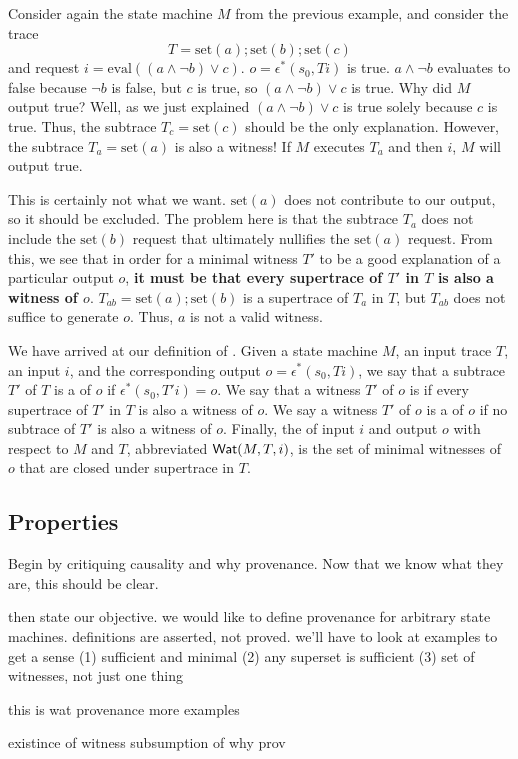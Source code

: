 \begin{example}
  \newcommand{\Mset}{\text{set}}
  \newcommand{\Meval}{\text{eval}}
  Consider again the state machine $M$ from the previous example, and consider
  the trace
  \[
    T = \Mset(a); \Mset(b); \Mset(c)
  \]
  and request $i = \Meval((a \land \lnot b) \lor c)$. $o = \epsilon^*(s_0, Ti)$
  is true. $a \land \lnot b$ evaluates to false because $\lnot b$ is false, but
  $c$ is true, so $(a \land \lnot b) \lor c$ is true.
  Why did $M$ output true? Well, as we just explained $(a \land \lnot b) \lor
  c$ is true solely because $c$ is true. Thus, the subtrace $T_c = \Mset(c)$
  should be the only explanation. However, the subtrace $T_a = \Mset(a)$ is
  also a witness! If $M$ executes $T_a$ and then $i$, $M$ will output true.

  This is certainly not what we want. $\Mset(a)$ does not contribute to our
  output, so it should be excluded. The problem here is that the subtrace $T_a$
  does not include the $\Mset(b)$ request that ultimately nullifies the
  $\Mset(a)$ request. From this, we see that in order for a minimal witness
  $T'$ to be a good explanation of a particular output $o$, \textbf{it must be
  that every supertrace of $T'$ in $T$ is also a witness of $o$}. $T_{ab} =
  \Mset(a); \Mset(b)$ is a supertrace of $T_a$ in $T$, but $T_{ab}$ does not
  suffice to generate $o$. Thus, $a$ is not a valid witness.
\end{example}

We have arrived at our definition of \watprovenance{}. Given a state machine
$M$, an input trace $T$, an input $i$, and the corresponding output $o =
\epsilon^*(s_0, Ti)$, we say that a subtrace $T'$ of $T$ is a 
of $o$ if $\epsilon^*(s_0, T'i) = o$. We say that a witness $T'$ of $o$ is
 if every supertrace of $T'$ in $T$ is
also a witness of $o$. We say a witness $T'$ of $o$ is a  of $o$ if no subtrace of $T'$ is also a witness of $o$. Finally, the
 of input $i$ and output $o$ with respect to $M$ and
$T$, abbreviated $\textsf{Wat}(M, T, i)$, is the set of minimal witnesses of $o$ that
are closed under supertrace in $T$.

\subsection{Properties}

Begin by critiquing causality and why provenance. Now that we know what they are, this should be clear.

then state our objective. we would like to define provenance for arbitrary state machines.
definitions are asserted, not proved. we'll have to look at examples to get a sense
(1) sufficient and minimal
(2) any superset is sufficient
(3) set of witnesses, not just one thing

this is wat provenance
more examples

existince of witness
subsumption of why prov

